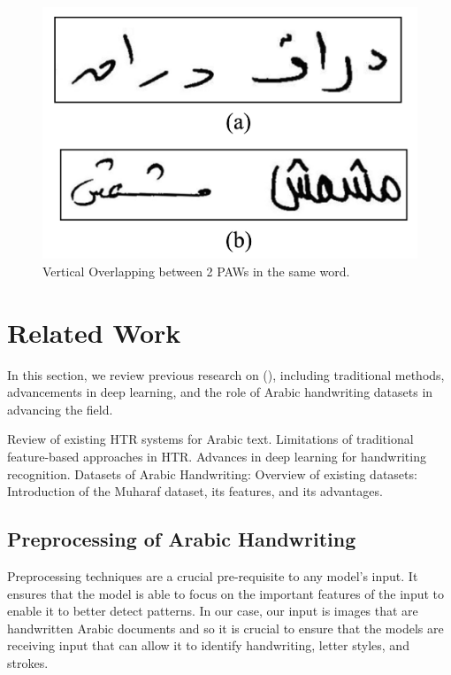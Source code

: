 \documentclass[conference]{IEEEtran}
\begin{document}
\begin{figure}[ht]
  \centering
  \includegraphics[width=0.7\linewidth]{Figs/fig4.png}
  \caption{Vertical Overlapping between 2 PAWs in the same word.}
  \label{fig:mr}
\end{figure}



\clearpage













\section{Related Work}
In this section, we review previous research on (), including traditional methods, advancements in deep learning, and the role of Arabic handwriting datasets in advancing the field.

Review of existing HTR systems for Arabic text.
Limitations of traditional feature-based approaches in HTR.
Advances in deep learning for handwriting recognition.
Datasets of Arabic Handwriting:
Overview of existing datasets: 
Introduction of the Muharaf dataset, its features, and its advantages.


\subsection{Preprocessing of Arabic Handwriting}

Preprocessing techniques are a crucial pre-requisite to any model's input. It ensures that the model is able to focus on the important features of the input to enable it to better detect patterns. In our case, our input is images that are handwritten Arabic documents and so it is crucial to ensure that the models are receiving input that can allow it to identify handwriting, letter styles, and strokes. 
\end{document}
